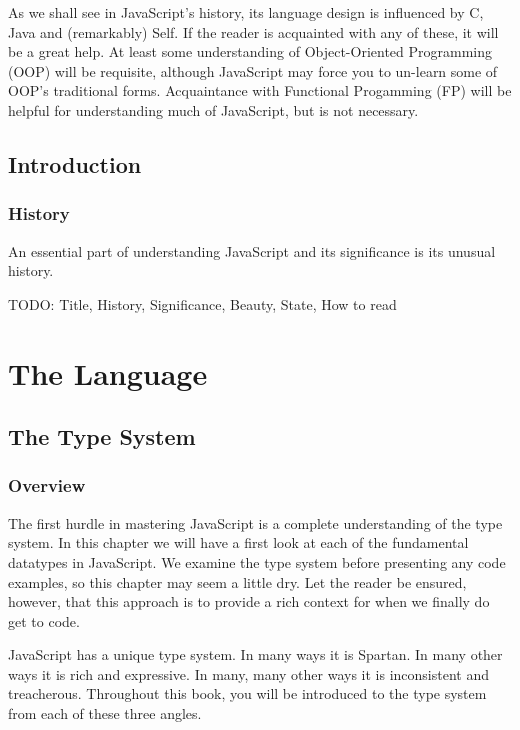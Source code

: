 \documentclass[11pt,letter]{book}
\begin{document}
    As we shall see in JavaScript's history, its language design is influenced by C, Java and 
    (remarkably) Self. If the reader is acquainted with any of these, it will be a great help. At 
    least some understanding of Object-Oriented Programming (OOP) will be requisite, although 
    JavaScript may force you to un-learn some of OOP's traditional forms. Acquaintance with 
    Functional Progamming (FP) will be helpful for understanding much of JavaScript, but is not 
    necessary.
    
    \chapter{Introduction}
    
    \section*{History}
    An essential part of understanding JavaScript and its significance is its unusual history.
    
    
    
    
    
    
    
    
    
    
    
    TODO: Title, History, Significance, Beauty, State, How to read
    
    \mainmatter
    
    \part{The Language}
    \chapter{The Type System}
	
	\section{Overview}
    The first hurdle in mastering JavaScript is a complete understanding of the type system. In this 
    chapter we will have a first look at each of the fundamental datatypes in JavaScript. We examine 
    the type system before presenting any code examples, so this chapter may seem a little dry. Let 
    the reader be ensured, however, that this approach is to provide a rich context for when we 
    finally do get to code.
    
    JavaScript has a unique type system. In many ways it is Spartan. In many other ways 
    it is rich and expressive. In many, many other ways it is inconsistent and treacherous.
    Throughout this book, you will be introduced to the type system from each of these three 
    angles.
    
\end{document}
